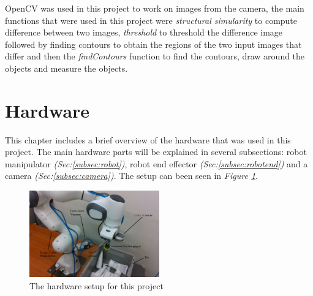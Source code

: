 OpenCV was used in this project to work on images from the camera, the main functions that were used in this project were \textit{structural simularity} to compute difference between two images,  \textit{threshold} to threshold the difference image followed by finding contours to obtain the regions of the two input images that differ and then the \textit{findContours} function to find the contours, draw around the objects and measure the objects.


\section{Hardware \label{sec:hardware}}
This chapter includes a brief overview of the hardware that was used in this project. The main hardware parts will be explained in several subsections: robot manipulator \textit{(Sec:\ref{subsec:robot})}, robot end effector \textit{(Sec:\ref{subsec:robotend})} and a camera \textit{(Sec:\ref{subsec:camera})}. The setup can been seen in \textit{Figure \ref{fig:setupproject}}.

\begin{figure}[h]
    \centering
    \includegraphics[width = 0.5\textwidth]{graphics/setup.jpg}
    \caption{The hardware setup for this project}
    \label{fig:setupproject}
\end{figure}

